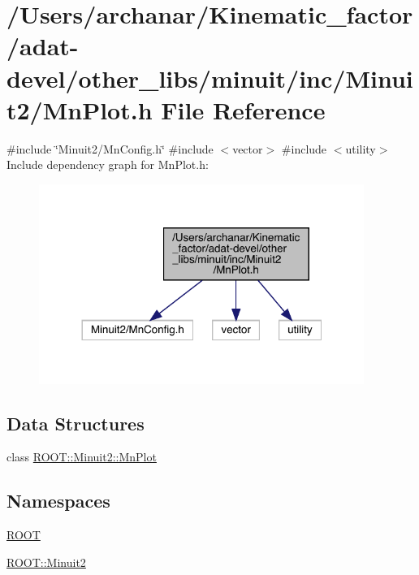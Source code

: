\hypertarget{adat-devel_2other__libs_2minuit_2inc_2Minuit2_2MnPlot_8h}{}\section{/\+Users/archanar/\+Kinematic\+\_\+factor/adat-\/devel/other\+\_\+libs/minuit/inc/\+Minuit2/\+Mn\+Plot.h File Reference}
\label{adat-devel_2other__libs_2minuit_2inc_2Minuit2_2MnPlot_8h}
{\ttfamily \#include \char`\"{}Minuit2/\+Mn\+Config.\+h\char`\"{}}\newline
{\ttfamily \#include $<$vector$>$}\newline
{\ttfamily \#include $<$utility$>$}\newline
Include dependency graph for Mn\+Plot.\+h\+:
\nopagebreak
\begin{figure}[H]
\begin{center}
\leavevmode
\includegraphics[width=300pt]{dd/df7/adat-devel_2other__libs_2minuit_2inc_2Minuit2_2MnPlot_8h__incl}
\end{center}
\end{figure}
\subsection*{Data Structures}
\begin{DoxyCompactItemize}
\item 
class \mbox{\hyperlink{classROOT_1_1Minuit2_1_1MnPlot}{R\+O\+O\+T\+::\+Minuit2\+::\+Mn\+Plot}}
\end{DoxyCompactItemize}
\subsection*{Namespaces}
\begin{DoxyCompactItemize}
\item 
 \mbox{\hyperlink{namespaceROOT}{R\+O\+OT}}
\item 
 \mbox{\hyperlink{namespaceROOT_1_1Minuit2}{R\+O\+O\+T\+::\+Minuit2}}
\end{DoxyCompactItemize}

